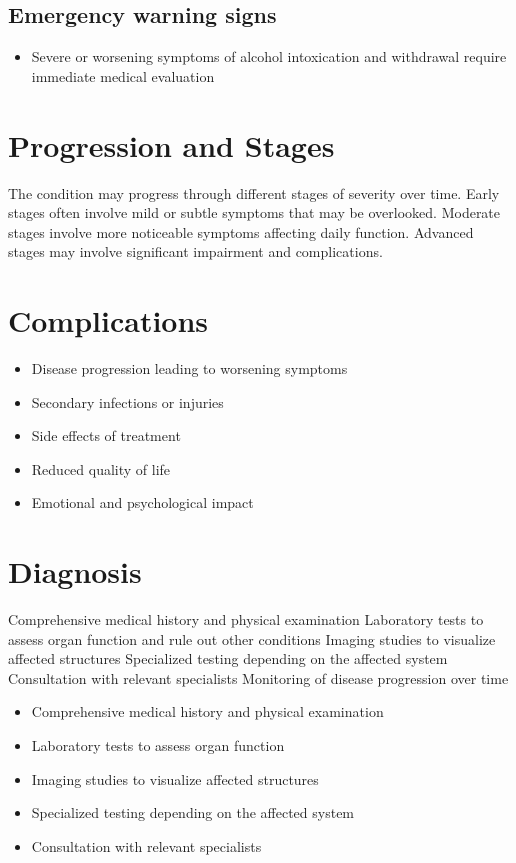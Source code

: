 \subsection{Emergency warning signs}
\begin{itemize}[noitemsep]
  \item Severe or worsening symptoms of alcohol intoxication and withdrawal require immediate medical evaluation
\end{itemize}
\section{Progression and Stages}
The condition may progress through different stages of severity over time. Early stages often involve mild or subtle symptoms that may be overlooked. Moderate stages involve more noticeable symptoms affecting daily function. Advanced stages may involve significant impairment and complications.
\section{Complications}
\begin{itemize}[noitemsep]
  \item Disease progression leading to worsening symptoms
  \item Secondary infections or injuries
  \item Side effects of treatment
  \item Reduced quality of life
  \item Emotional and psychological impact
\end{itemize}
\section{Diagnosis}
Comprehensive medical history and physical examination Laboratory tests to assess organ function and rule out other conditions Imaging studies to visualize affected structures Specialized testing depending on the affected system Consultation with relevant specialists Monitoring of disease progression over time

\begin{itemize}[noitemsep]
  \item Comprehensive medical history and physical examination
  \item Laboratory tests to assess organ function
  \item Imaging studies to visualize affected structures
  \item Specialized testing depending on the affected system
  \item Consultation with relevant specialists
\end{itemize}
